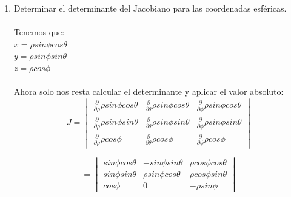 \documentclass[10pt,letterpaper,fleqn]{article}
\begin{document}
\begin{enumerate}
        \item Determinar el determinante del Jacobiano para las coordenadas esféricas.\\\\
        Tenemos que:\\
        $x = \rho sin\phi cos\theta$\\ 
        $y = \rho sin\phi sin\theta$\\ 
        $z = \rho cos\phi$\\\\
        Ahora solo nos resta calcular el determinante y aplicar el valor absoluto:\\
        \[
        J =
        \begin{vmatrix}
        \frac{\partial}{\partial \rho} \rho sin\phi cos\theta & 
        \frac{\partial}{\partial \theta} \rho sin\phi cos\theta & 
        \frac{\partial}{\partial \phi} \rho sin\phi cos\theta \\ 
        \frac{\partial}{\partial \rho} \rho sin\phi sin\theta & 
        \frac{\partial}{\partial \theta} \rho sin\phi sin\theta & 
        \frac{\partial}{\partial \phi} \rho sin\phi sin\theta \\
        \frac{\partial}{\partial \rho} \rho cos\phi & 
        \frac{\partial}{\partial \theta} \rho cos\phi & 
        \frac{\partial}{\partial \phi} \rho cos\phi
        \end{vmatrix}
        \] 

		\[        
        =
        \begin{vmatrix}
        sin\phi cos\theta & 
        - sin\phi sin\theta & 
        \rho cos\phi cos\theta \\ 
        sin\phi sin\theta & 
        \rho sin\phi cos\theta & 
        \rho cos\phi sin\theta \\
        cos\phi & 
        0 & 
        - \rho sin\phi
        \end{vmatrix}
        \] 
        

\end{enumerate}
\end{document}
